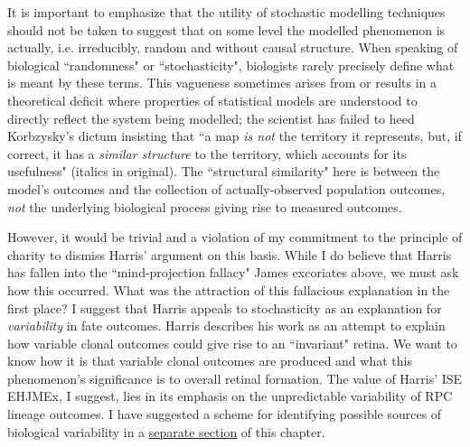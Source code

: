 It is important to emphasize that the utility of stochastic modelling techniques should not be taken to suggest that on some level the modelled phenomenon is actually, i.e. irreducibly, random and without causal structure. When speaking of biological ``randomness" or ``stochasticity", biologists rarely precisely define what is meant by these terms. This vagueness sometimes arises from or results in a theoretical deficit where properties of statistical models are understood to directly reflect the system being modelled; the scientist has failed to heed Korbzysky's dictum insisting that ``a map \textit{is not} the territory it represents, but, if correct, it has a \textit{similar structure} to the territory, which accounts for its usefulness" \cite{Korzybski2005} (italics in original). The ``structural similarity" here is between the model's outcomes and the collection of actually-observed population outcomes, \textit{not} the underlying biological process giving rise to measured outcomes.

However, it would be trivial and a violation of my commitment to the principle of charity to dismiss Harris' argument on this basis. While I do believe that Harris has fallen into the ``mind-projection fallacy" James excoriates above, we must ask how this occurred. What was the attraction of this fallacious explanation in the first place? I suggest that Harris appeals to stochasticity as an explanation for \textit{variability} in fate outcomes. Harris describes his work as an attempt to explain how variable clonal outcomes could give rise to an ``invariant" retina. We want to know how it is that variable clonal outcomes are produced and what this phenomenon's significance is to overall retinal formation. The value of Harris' ISE EHJMEx, I suggest, lies in its emphasis on the unpredictable variability of RPC lineage outcomes. I have suggested a scheme for identifying possible sources of biological variability in a \hyperref[variability]{separate section} of this chapter.

